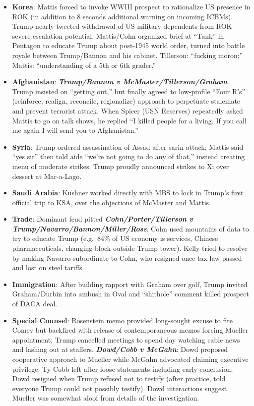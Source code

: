 \documentclass[
]{article}
\begin{document}
\begin{itemize}
\item
  \textbf{Korea}: Mattis forced to invoke WWIII prospect to rationalize
  US presence in ROK (in addition to 8 seconds additional warning on
  incoming ICBMs). Trump nearly tweeted withdrawal of US military
  dependents from ROK---severe escalation potential. Mattis/Cohn
  organized brief at ``Tank'' in Pentagon to educate Trump about
  post-1945 world order, turned into battle royale between Trump/Bannon
  and his cabinet. Tillerson: ``fucking moron;'' Mattis: ``understanding
  of a 5th or 6th grader.''
\item
  \textbf{Afghanistan}: \textbf{\emph{Trump/Bannon v
  McMaster/Tillerson/Graham}}. Trump insisted on ``getting out,'' but
  finally agreed to low-profile ``Four R's'' (reinforce, realign,
  reconcile, regionalize) approach to perpetuate stalemate and prevent
  terrorist attack. When Spicer (USN Reserves) repeatedly asked Mattis
  to go on talk shows, he replied ``I killed people for a living. If you
  call me again I will send you to Afghanistan.''
\item
  \textbf{Syria}: Trump ordered assassination of Assad after sarin
  attack; Mattis said ``yes sir'' then told aide ``we're not going to do
  any of that,'' instead creating menu of moderate strikes. Trump
  proudly announced strikes to Xi over dessert at Mar-a-Lago.
\item
  \textbf{Saudi Arabia}: Kushner worked directly with MBS to lock in
  Trump's first official trip to KSA, over the objections of McMaster
  and Mattis.
\item
  \textbf{Trade}: Dominant feud pitted
  \textbf{\emph{Cohn/Porter/Tillerson v
  Trump/Navarro/Bannon/Miller/Ross}}. Cohn used mountains of data to try
  to educate Trump (e.g.~84\% of US economy is services, Chinese
  pharmaceuticals, changing block outside Trump tower). Kelly tried to
  resolve by making Navarro subordinate to Cohn, who resigned once tax
  law passed and lost on steel tariffs.
\item
  \textbf{Immigration}: After building rapport with Graham over golf,
  Trump invited Graham/Durbin into ambush in Oval and ``shithole''
  comment killed prospect of DACA deal.
\item
  \textbf{Special Counsel}: Rosenstein memo provided long-sought excuse
  to fire Comey but backfired with release of contemporaneous memos
  forcing Mueller appointment; Trump cancelled meetings to spend day
  watching cable news and lashing out at staffers.
  \textbf{\emph{Dowd/Cobb v McGahn}}: Dowd proposed cooperative approach
  to Mueller while McGahn advocated claiming executive privilege. Ty
  Cobb left after loose statements including early conclusion; Dowd
  resigned when Trump refused not to testify (after practice, told
  everyone Trump could not possibly testify). Dowd interactions suggest
  Mueller was somewhat aloof from details of the investigation.
\end{itemize}
\end{document}
